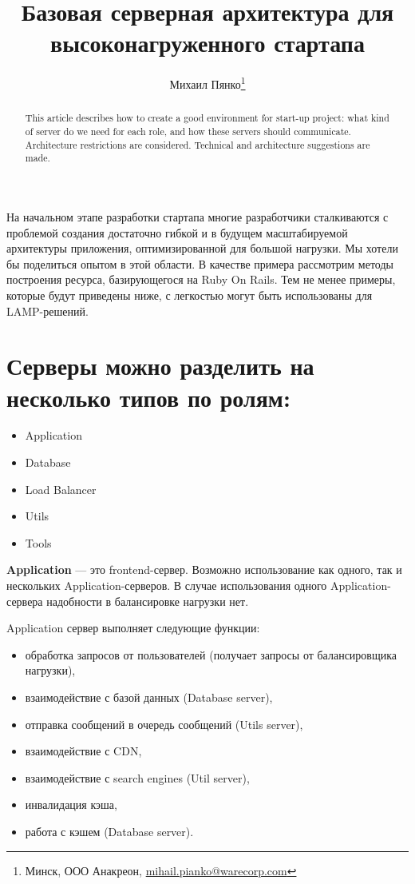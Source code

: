 \documentclass[10pt, a5paper]{article}
\begin{document}
\title{Базовая серверная архитектура для высоконагруженного стартапа}

\author{Михаил Пянко\footnote{Минск, ООО Анакреон, \url{mihail.pianko@warecorp.com}}}
\maketitle

\begin{abstract}
This article describes how to create a good environment for start-up project: what kind of server do we need for each role, and how these servers should communicate. Architecture restrictions are considered. Technical and architecture suggestions are made.
\end{abstract}

На начальном этапе разработки стартапа многие разработчики сталкиваются с проблемой создания достаточно гибкой и в будущем масштабируемой архитектуры приложения, оптимизированной для большой нагрузки. Мы хотели бы поделиться опытом в этой области. В качестве примера рассмотрим методы построения ресурса, базирующегося на Ruby On Rails. Тем не менее примеры, которые будут приведены ниже, с легкостью могут быть использованы для LAMP-решений. 

\section*{Серверы можно разделить на несколько типов по ролям:}
\begin{itemize}
\item Application
\item Database 
\item Load Balancer
\item Utils
\item Tools
\end{itemize}

{\bf Application} --- это frontend-сервер. Возможно использование как одного, так и нескольких Application-серверов. В случае использования одного Application-сервера надобности в балансировке нагрузки нет.

Application сервер выполняет следующие функции:
\begin{itemize}
\item обработка запросов от пользователей (получает запросы от балансировщика нагрузки),
\item взаимодействие с базой данных (Database server),
\item отправка сообщений в очередь сообщений (Utils server),
\item взаимодействие с CDN,
\item взаимодействие с search engines (Util server),
\item инвалидация кэша,
\item работа с кэшем (Database server).
\end{itemize}
\end{document}
